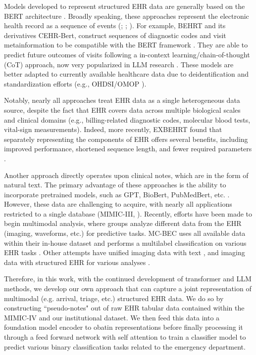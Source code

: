 \documentclass[pmlr]{jmlr}%
\begin{document}
Models developed to represent structured EHR data are generally based on the BERT architecture \citep{kalyan_ammu_2022}. Broadly speaking, these approaches represent the electronic health record as a sequence of events (\cite{wornow2024ehrshot}; \cite{hur2023genhpf}; \cite{hur2022unifying}). For example, BEHRT and its derivatives CEHR-Bert, construct sequences of diagnostic codes and visit metainformation to be compatible with the BERT framework \citep{li_behrt_2020, li_hi-behrt_2021, rasmy_med-bert_2021, pang_cehr-bert_nodate}. They are able to predict future outcomes of visits following a in-context learning/chain-of-thought (CoT) approach, now very popularized in LLM research \citep{wei2022chain}. These models are better adapted to currently available healthcare data due to deidentification and standardization efforts (e.g., OHDSI/OMOP \citep{noauthor_omop_nodate}). 

Notably, nearly all approaches treat EHR data as a single heterogeneous data source, despite the fact that EHR covers data across multiple biological scales and clinical domains (e.g., billing-related diagnostic codes, molecular blood tests, vital-sign measurements). Indeed, more recently, EXBEHRT found that separately representing the components of EHR offers several benefits, including improved performance, shortened sequence length, and fewer required parameters \citep{rupp_exbehrt_2023}.

Another approach directly operates upon clinical notes, which are in the form of natural text. The primary advantage of these approaches is the ability to incorporate pretrained models, such as GPT, BioBert, PubMedBert, etc. \citep{roy-pan-2021-incorporating, chief-bert}. However, these data are challenging to acquire, with nearly all applications restricted to a single database (MIMIC-III, \citep{johnson_mimic-iii_2016}). Recently, efforts have been made to begin multimodal analysis, where groups analyze different data from the EHR (imaging, waveforms, etc.) for predictive tasks. MC-BEC uses all available data within their in-house dataset and performs a multilabel classification on various EHR tasks \citep{chen2023multimodal}. Other attempts have unified imaging data with text \citep{khader2023medical}, and imaging data with structured EHR for various analyses \citep{zhou2023transformer}.

Therefore, in this work, with the continued development of transformer and LLM methods, we develop our own approach that can capture a joint representation of multimodal (e.g. arrival, triage, etc.) structured EHR data. We do so by constructing ``pseudo-notes" out of raw EHR tabular data contained within the MIMIC-IV and our institutional dataset. We then feed this data into a foundation model encoder to obatin representations before finally processing it through a feed forward network with self attention to train a classifier model to predict various binary classification tasks related to the emergency department. 
\end{document}
